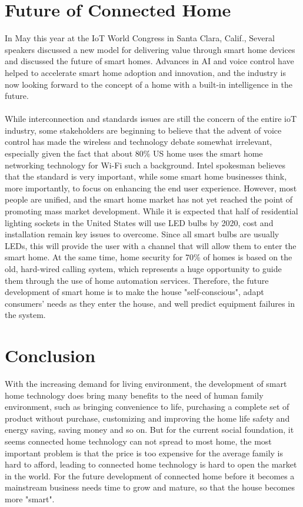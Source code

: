 \documentclass[report]{IEEEtran}
\begin{document}
\section{Future of Connected Home}
In May this year at the IoT World Congress in Santa Clara, Calif., Several speakers discussed a new model for delivering value through smart home devices and discussed the future of smart homes. Advances in AI and voice control have helped to accelerate smart home adoption and innovation, and the industry is now looking forward to the concept of a home with a built-in intelligence in the future.
\\\\While interconnection and standards issues are still the concern of the entire ioT industry, some stakeholders are beginning to believe that the advent of voice control has made the wireless and technology debate somewhat irrelevant, especially given the fact that about 80\% US home uses the smart home networking technology for Wi-Fi such a background. Intel spokesman believes that the standard is very important, while some smart home businesses think, more importantly, to focus on enhancing the end user experience. However, most people are unified, and the smart home market has not yet reached the point of promoting mass market development. While it is expected that half of residential lighting sockets in the United States will use LED bulbs by 2020, cost and installation remain key issues to overcome. Since all smart bulbs are usually LEDs, this will provide the user with a channel that will allow them to enter the smart home. At the same time, home security for 70\% of homes is based on the old, hard-wired calling system, which represents a huge opportunity to guide them through the use of home automation services. Therefore, the future development of smart home is to make the house "self-conscious", adapt consumers' needs as they enter the house, and well predict equipment failures in the system.

\section{Conclusion}
With the increasing demand for living environment, the development of smart home technology does bring many benefits to the need of human family environment, such as bringing convenience to life, purchasing a complete set of product without purchase, customizing and improving the home life safety and energy saving, saving money and so on. But for the current social foundation, it seems connected home technology can not spread to most home, the most important problem is that the price is too expensive for the average family is hard to afford, leading to connected home technology is hard to open the market in the world. For the future development of connected home before it becomes a mainstream business needs time to grow and mature, so that the house becomes more "smart".
\end{document}
